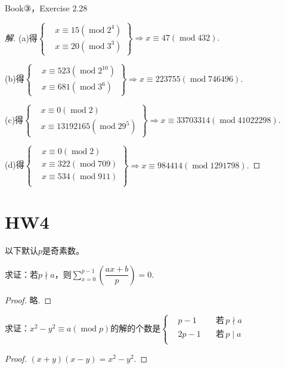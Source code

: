 \begin{exercise}
    Book③，Exercise 2.28
\end{exercise}
\begin{proof}[解]
    (a)得$\left\{ 
    \begin{aligned}
        &    x\equiv15(\operatorname{mod}2^4)\\
        &    x\equiv20(\operatorname{mod}3^3)
    \end{aligned}
     \right\}\Longrightarrow x\equiv47(\operatorname{mod}432).$

     (b)得$\left\{ 
    \begin{aligned}
        &    x\equiv523(\operatorname{mod}2^10)\\
        &    x\equiv681(\operatorname{mod}3^6)
    \end{aligned}
     \right\}\Longrightarrow x\equiv223755(\operatorname{mod}746496).$

     (c)得$\left\{ 
    \begin{aligned}
        &    x\equiv0(\operatorname{mod}2)\\
        &    x\equiv13192165(\operatorname{mod}29^5)
    \end{aligned}
     \right\}\Longrightarrow x\equiv33703314(\operatorname{mod}41022298).$

     (d)得$\left\{ 
    \begin{aligned}
        &    x\equiv0(\operatorname{mod}2)\\
        &    x\equiv322(\operatorname{mod}709)\\
        &    x\equiv534(\operatorname{mod}911)\\
    \end{aligned}
     \right\}\Longrightarrow x\equiv984414(\operatorname{mod}1291798).$
\end{proof}

\section{HW4}
以下默认$p$是奇素数。
\begin{exercise}
    求证：若$p\nmid a$，则$\sum\limits_{x=0}^{p-1}\left( \dfrac{ax+b}{p} \right)=0$.
\end{exercise}
\begin{proof}
    略.
\end{proof}

\begin{exercise}
    求证：$x^2-y^2\equiv a(\operatorname{mod}p)$的解的个数是$
    \left\{ 
    \begin{aligned}
        &p-1\quad&若\,p\nmid a\\
        &2p-1\quad&若\,p\mid a\\
    \end{aligned}
     \right.
    $
\end{exercise}
\begin{proof}
    $(x+y)(x-y)=x^2-y^2$.
\end{proof}


